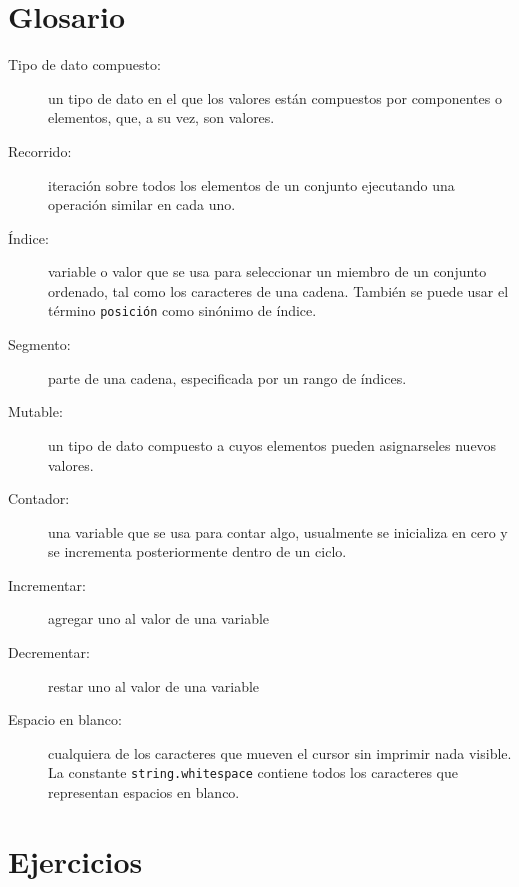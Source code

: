 \section{Glosario}
\begin{description}
\item [{Tipo de dato compuesto:}] un tipo de dato en el que los valores
están compuestos por componentes o elementos, que, a su vez, son valores.
\item [{Recorrido:}] iteración sobre todos los elementos de un conjunto
ejecutando una operación similar en cada uno.
\item [{Índice:}] variable o valor que se usa para seleccionar un miembro
de un conjunto ordenado, tal como los caracteres de una cadena. También
se puede usar el término \texttt{posición} como sinónimo de índice.
\item [{Segmento:}] parte de una cadena, especificada por un rango de índices.
\item [{Mutable:}] un tipo de dato compuesto a cuyos elementos pueden asignarseles
nuevos valores.
\item [{Contador:}] una variable que se usa para contar algo, usualmente
se inicializa en cero y se incrementa posteriormente dentro de un
ciclo.
\item [{Incrementar:}] agregar uno al valor de una variable
\item [{Decrementar:}] restar uno al valor de una variable
\item [{Espacio en blanco:}] cualquiera de los caracteres que mueven el
cursor sin imprimir nada visible. La constante \texttt{string.whitespace}
contiene todos los caracteres que representan espacios en blanco.

  
   
 
\end{description}

\section{Ejercicios}

